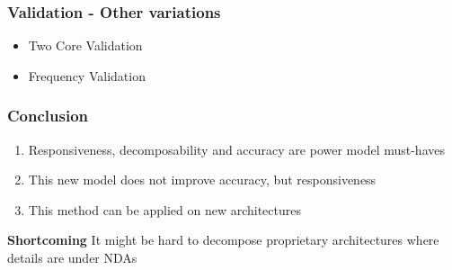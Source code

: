 \documentclass[screen]{beamer}
\begin{document}
\begin{frame}
    \frametitle{Validation - Other variations}

    \begin{itemize}
        \item Two Core Validation
        \item Frequency Validation
    \end{itemize}

\end{frame}

\begin{frame}

    \frametitle{Conclusion}

    \begin{enumerate}
        \item Responsiveness, decomposability and accuracy are power model must-haves
        \item This new model does not improve accuracy, but responsiveness
        \item This method can be applied on new architectures
    \end{enumerate}

    \textbf{Shortcoming}
        It might be hard to decompose proprietary architectures where details are under NDAs
\end{frame}
\end{document}
